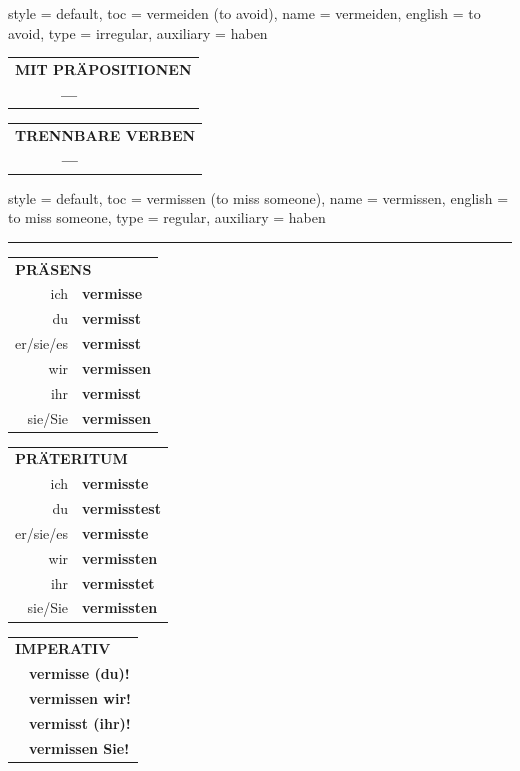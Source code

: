 \begin{verbentry}{
  style = {default},
  toc = {vermeiden (to avoid)},
  name = {vermeiden},
  english = {to avoid},
  type = {irregular},
  auxiliary = {haben}
}
\vspace{10pt}

\begin{tabular}{lll}
\multicolumn{3}{l}{\textbf{MIT PRÄPOSITIONEN}}\\
& \textbf{---} & \\
\end{tabular}
\hfill
\begin{tabular}{lll}
\multicolumn{3}{l}{\textbf{TRENNBARE VERBEN}}\\
& \textbf{---} & \\
\end{tabular}
\vspace{-5pt}
\end{verbentry}

\begin{verbentry}{
  style = {default},
  toc = {vermissen (to miss someone)},
  name = {vermissen},
  english = {to miss someone},
  type = {regular},
  auxiliary = {haben}
}


\vspace{5pt}
\hrule
\vspace{5pt}

\begin{tabular}{rl}
\multicolumn{2}{l}{\textbf{PRÄSENS}}\\
ich & \textbf{vermisse}\\
du & \textbf{vermisst}\\
er/sie/es & \textbf{vermisst}\\
wir & \textbf{vermissen}\\
ihr & \textbf{vermisst}\\
sie/Sie & \textbf{vermissen}\\
\end{tabular}
\hfill
\begin{tabular}{rl}
\multicolumn{2}{l}{\textbf{PRÄTERITUM}}\\
ich & \textbf{vermisste}\\
du & \textbf{vermisstest}\\
er/sie/es & \textbf{vermisste}\\
wir & \textbf{vermissten}\\
ihr & \textbf{vermisstet}\\
sie/Sie & \textbf{vermissten}\\
\end{tabular}
\hfill
\begin{tabular}{rl}
\multicolumn{2}{l}{\textbf{IMPERATIV}}\\
& \textbf{vermisse (du)!}\\
& \textbf{vermissen wir!}\\
& \textbf{vermisst (ihr)!}\\
& \textbf{vermissen Sie!}\\
\end{tabular}


\end{verbentry}
